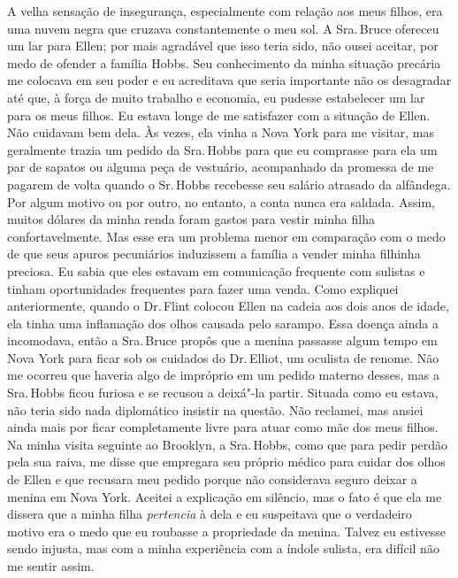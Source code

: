 A velha sensação de insegurança,
especialmente com relação aos meus filhos, era uma nuvem negra que
cruzava constantemente o meu sol. A Sra.\,Bruce ofereceu um lar para
Ellen; por mais agradável que isso teria sido, não ousei aceitar, por
medo de ofender a família Hobbs. Seu conhecimento da minha situação
precária me colocava em seu poder e eu acreditava que seria importante
não os desagradar até que, à força de muito trabalho e economia, eu
pudesse estabelecer um lar para os meus filhos. Eu estava longe de me
satisfazer com a situação de Ellen. Não cuidavam bem dela. Às vezes, ela
vinha a Nova York para me visitar, mas geralmente trazia um pedido da
Sra.\,Hobbs para que eu comprasse para ela um par de sapatos ou alguma
peça de vestuário, acompanhado da promessa de me pagarem de volta quando
o Sr.\,Hobbs recebesse seu salário atrasado da alfândega. Por algum
motivo ou por outro, no entanto, a conta nunca era saldada. Assim,
muitos dólares da minha renda foram gastos para vestir minha filha
confortavelmente. Mas esse era um problema menor em comparação com o
medo de que seus apuros pecuniários induzissem a família a vender minha
filhinha preciosa. Eu sabia que eles estavam em comunicação frequente
com sulistas e tinham oportunidades frequentes para fazer uma venda.
Como expliquei anteriormente, quando o Dr.\,Flint colocou Ellen na cadeia
aos dois anos de idade, ela tinha uma inflamação dos olhos causada pelo
sarampo. Essa doença ainda a incomodava, então a Sra.\,Bruce propôs que a
menina passasse algum tempo em Nova York para ficar sob os cuidados do
Dr.\,Elliot, um oculista de renome. Não me ocorreu que haveria algo de
impróprio em um pedido materno desses, mas a Sra.\,Hobbs ficou furiosa e
se recusou a deixá"-la partir. Situada como eu estava, não teria sido
nada diplomático insistir na questão. Não reclamei, mas ansiei ainda
mais por ficar completamente livre para atuar como mãe dos meus filhos.
Na minha visita seguinte ao Brooklyn, a Sra.\,Hobbs, como que para pedir
perdão pela sua raiva, me disse que empregara seu próprio médico para
cuidar dos olhos de Ellen e que recusara meu pedido porque não
considerava seguro deixar a menina em Nova York. Aceitei a explicação em
silêncio, mas o fato é que ela me dissera que a minha filha
\emph{pertencia} à dela e eu suspeitava que o verdadeiro motivo era o
medo que eu roubasse a propriedade da menina. Talvez eu estivesse sendo
injusta, mas com a minha experiência com a índole sulista, era difícil
não me sentir assim.

